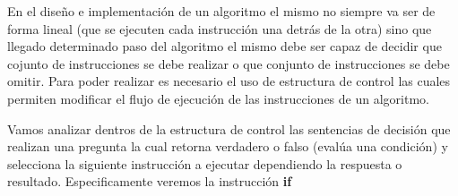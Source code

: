 En el diseño e implementación de un algoritmo el mismo no siempre va ser de forma lineal (que se ejecuten cada instrucción una detrás de la otra) sino que llegado determinado paso del algoritmo el mismo debe ser capaz de decidir que cojunto de instrucciones se debe realizar  o que conjunto de instrucciones se debe omitir. Para poder realizar es necesario el uso de estructura de control las cuales permiten modificar el flujo de ejecución de las instrucciones de un algoritmo.

Vamos analizar dentros de la estructura de control las sentencias de decisión que
realizan una pregunta la cual retorna verdadero o falso (evalúa una condición) y selecciona la
siguiente instrucción a ejecutar dependiendo la respuesta o resultado. Especificamente veremos la instrucción \textbf{if}